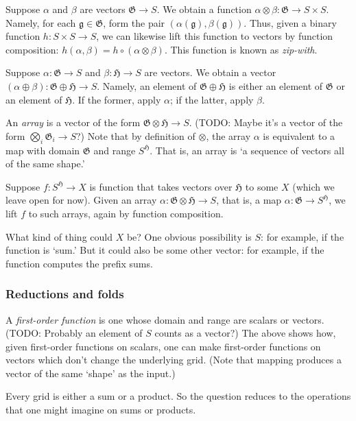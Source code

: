 \documentclass[11pt]{article}
\newcommand{\gr}[1]{\mathfrak{#1}}
\newcommand{\GG}{\gr{G}}
\begin{document}
Suppose \(\alpha\) and \(\beta\) are vectors \(\GG\to S\). We obtain a function
\(\alpha\otimes\beta : \GG\to S\times S\). Namely, for each \(\mathfrak{g}\in \GG\),
form the pair \((\alpha(\mathfrak{g}), \beta(\mathfrak{g}))\). Thus, given a
binary function \(h : S\times S\to S\), we can likewise lift this function to
vectors by function composition: \(h(\alpha, \beta) = h\circ
(\alpha\otimes\beta)\). This function is known as \emph{zip-with}.

Suppose \(\alpha : \gr{G}\to S\) and \(\beta : \gr{H}\to S\) are vectors. We obtain
a vector \((\alpha\oplus\beta) : \gr{G}\oplus\gr{H}\to S\). Namely, an element of
\(\gr{G}\oplus\gr{H}\) is either an element of \(\gr{G}\) or an element of
\(\gr{H}\). If the former, apply \(\alpha\); if the latter, apply \(\beta\). 

An \emph{array} is a vector of the form \(\gr{G}\otimes\gr{H}\to S\). (TODO: Maybe it's
a vector of the form \(\bigotimes_i \gr{G}_i\to S\)?) Note that by definition of
\(\otimes\), the array \(\alpha\) is equivalent to a map with domain \(\gr{G}\) and
range \(S^\gr{H}\). That is, an array is ‘a sequence of vectors all of the same
shape.’

Suppose \(f:S^\gr{H}\to X\) is function that takes vectors over \(\gr{H}\) to
some \(X\) (which we leave open for now). Given an array \(\alpha : \gr{G}\otimes
\gr{H}\to S\), that is, a map \(\alpha : \gr{G}\to S^\gr{H}\), we lift \(f\) to
such arrays, again by function composition.

What kind of thing could \(X\) be? One obvious possibility is \(S\): for example, if
the function is ‘sum.’ But it could also be some other vector: for example, if
the function computes the prefix sums. 

\subsubsection{Reductions and folds}
\label{sec:org1f2a8ac}

A  \emph{first-order  function}  is  one  whose  domain  and  range  are  scalars  or
vectors. (TODO: Probably an element of \(S\)  counts as a vector?) The above shows
how, given first-order functions on  scalars, one can make first-order functions
on vectors which don't change the underlying grid. (Note that mapping produces a
vector of the same `shape' as the input.)

Every grid is either a sum or a product. So the question reduces to the
operations that one might imagine on sums or products. 
\end{document}
